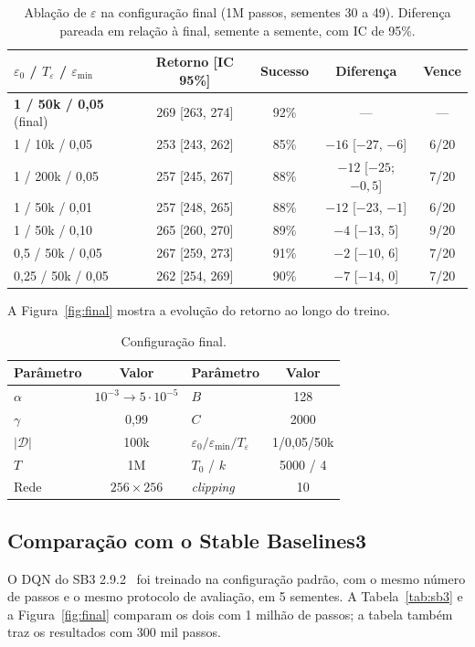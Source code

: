 \documentclass[conference]{IEEEtran}
\begin{document}
\begin{table}[t]
\centering
\caption{Ablação de $\varepsilon$ na configuração final (1M passos, sementes 30 a 49). Diferença pareada em relação à final, semente a semente, com IC de 95\%.}
\label{tab:eps}
\small
\begin{tabular}{@{}lcccc@{}}
\toprule
$\varepsilon_0$ / $T_\varepsilon$ / $\varepsilon_{\min}$ & Retorno [IC 95\%] & Sucesso & Diferença & Vence \\
\midrule
\textbf{1 / 50k / 0,05} (final) & 269 [263, 274] & 92\% & --- & --- \\
1 / 10k / 0,05 & 253 [243, 262] & 85\% & $-16$ [$-27$, $-6$] & 6/20 \\
1 / 200k / 0,05 & 257 [245, 267] & 88\% & $-12$ [$-25$; $-0{,}5$] & 7/20 \\
1 / 50k / 0,01 & 257 [248, 265] & 88\% & $-12$ [$-23$, $-1$] & 6/20 \\
1 / 50k / 0,10 & 265 [260, 270] & 89\% & $-4$ [$-13$, 5] & 9/20 \\
0,5 / 50k / 0,05 & 267 [259, 273] & 91\% & $-2$ [$-10$, 6] & 7/20 \\
0,25 / 50k / 0,05 & 262 [254, 269] & 90\% & $-7$ [$-14$, 0] & 7/20 \\
\bottomrule
\end{tabular}
\end{table}

A Figura~\ref{fig:final} mostra a evolução do retorno ao longo do treino.

\begin{table}[t]
\centering
\caption{Configuração final.}
\label{tab:final}
\small
\begin{tabular}{@{}lc@{\hspace{1.2em}}lc@{}}
\toprule
Parâmetro & Valor & Parâmetro & Valor \\
\midrule
$\alpha$ & $10^{-3}\!\rightarrow\!5\cdot10^{-5}$ & $B$ & 128 \\
$\gamma$ & 0,99 & $C$ & 2000 \\
$|\mathcal{D}|$ & 100k & $\varepsilon_0/\varepsilon_{\min}/T_\varepsilon$ & 1/0,05/50k \\
$T$ & 1M & $T_0$ / $k$ & 5000 / 4 \\
Rede & $256\times256$ & \textit{clipping} & 10 \\
\bottomrule
\end{tabular}
\end{table}

\subsection{Comparação com o Stable Baselines3}
O DQN do SB3 2.9.2~\cite{sb3} foi treinado na configuração padrão, com o mesmo número de passos e o mesmo protocolo de avaliação, em 5 sementes. A Tabela~\ref{tab:sb3} e a Figura~\ref{fig:final} comparam os dois com 1 milhão de passos; a tabela também traz os resultados com 300 mil passos.
\end{document}
